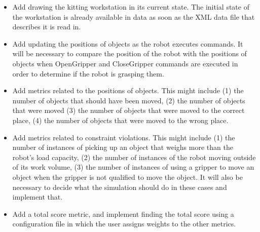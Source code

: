\begin{itemize}

\item Add drawing the kitting workstation in its current state. The initial
  state of the workstation is already available in data as soon as the XML
  data file that describes it is read in. 

\item Add updating the positions of objects as the robot executes commands.
  It will be necessary to compare the position of the robot with the
  positions of objects when OpenGripper and CloseGripper commands are
  executed in order to determine if the robot is grasping them.

\item Add metrics related to the positions of objects. This might include
  (1) the number of objects that should have been moved, (2) the number of
  objects that were moved (3) the number of objects that were moved to the
  correct place, (4) the number of objects that were moved to the wrong
  place.

\item Add metrics related to constraint violations. This might include (1)
  the number of instances of picking up an object that weighs more than the
  robot's load capacity, (2) the number of instances of the robot moving
  outside of its work volume, (3) the number of instances of using a
  gripper to move an object when the gripper is not qualified to move the
  object. It will also be necessary to decide what the simulation should do
  in these cases and implement that.

\item Add a total score metric, and implement finding the total score using
  a configuration file in which the user assigns weights to the other
  metrics.

\end{itemize}